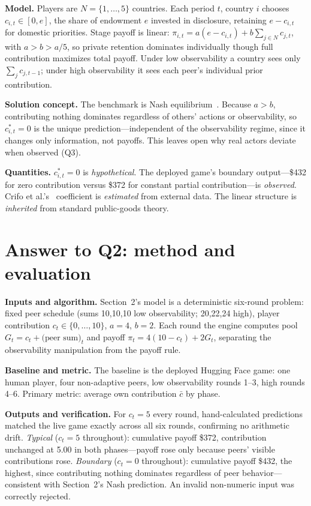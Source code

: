 \textbf{Model.} Players are $N=\{1,\dots,5\}$ countries. Each period $t$, country $i$ chooses $c_{i,t}\in[0,e]$, the share of endowment $e$ invested in disclosure, retaining $e-c_{i,t}$ for domestic priorities. Stage payoff is linear: $\pi_{i,t}=a(e-c_{i,t})+b\sum_{j\in N}c_{j,t}$, with $a>b>a/5$, so private retention dominates individually though full contribution maximizes total payoff. Under low observability a country sees only $\sum_j c_{j,t-1}$; under high observability it sees each peer's individual prior contribution.

\textbf{Solution concept.} The benchmark is Nash equilibrium~\cite{nash1950}. Because $a>b$, contributing nothing dominates regardless of others' actions or observability, so $c_{i,t}^{*}=0$ is the unique prediction---independent of the observability regime, since it changes only information, not payoffs. This leaves open why real actors deviate when observed (Q3).

\textbf{Quantities.} $c_{i,t}^{*}=0$ is \emph{hypothetical}. The deployed game's boundary output---\$432 for zero contribution versus \$372 for constant partial contribution---is \emph{observed}. Crifo et al.'s~\cite{crifo2017} coefficient is \emph{estimated} from external data. The linear structure is \emph{inherited} from standard public-goods theory.

\section{Answer to Q2: method and evaluation}
\textbf{Inputs and algorithm.} Section~2's model is a deterministic six-round problem: fixed peer schedule (sums 10,10,10 low observability; 20,22,24 high), player contribution $c_t\in\{0,\dots,10\}$, $a=4$, $b=2$. Each round the engine computes pool $G_t=c_t+\text{(peer sum)}_t$ and payoff $\pi_t=4(10-c_t)+2G_t$, separating the observability manipulation from the payoff rule.

\textbf{Baseline and metric.} The baseline is the deployed Hugging Face game: one human player, four non-adaptive peers, low observability rounds 1--3, high rounds 4--6. Primary metric: average own contribution $\bar c$ by phase.

\textbf{Outputs and verification.} For $c_t=5$ every round, hand-calculated predictions matched the live game exactly across all six rounds, confirming no arithmetic drift. \emph{Typical} ($c_t=5$ throughout): cumulative payoff \$372, contribution unchanged at 5.00 in both phases---payoff rose only because peers' visible contributions rose. \emph{Boundary} ($c_t=0$ throughout): cumulative payoff \$432, the highest, since contributing nothing dominates regardless of peer behavior---consistent with Section~2's Nash prediction. An invalid non-numeric input was correctly rejected.

